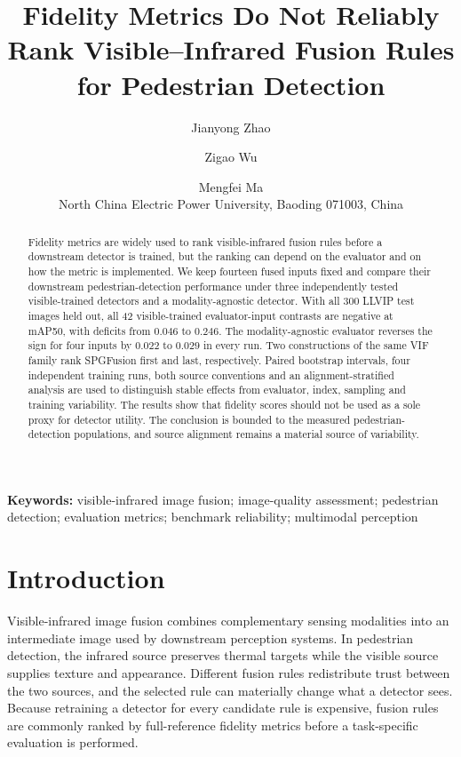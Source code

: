\documentclass[10pt,a4paper]{article}
\begin{document}
\title{Fidelity Metrics Do Not Reliably Rank Visible--Infrared Fusion Rules
for Pedestrian Detection}

\author{Jianyong Zhao \and Zigao Wu \and Mengfei Ma\\[4pt]
\small North China Electric Power University, Baoding 071003, China}
\date{}

\maketitle
\begingroup
\renewcommand{\thefootnote}{}
\endgroup

\begin{abstract}
Fidelity metrics are widely used to rank visible-infrared fusion rules before a
downstream detector is trained, but the ranking can depend on the evaluator and on how
the metric is implemented. We keep fourteen fused inputs fixed and compare their
downstream pedestrian-detection performance under three independently tested
visible-trained detectors and a modality-agnostic detector. With all 300 LLVIP test
images held out, all 42 visible-trained evaluator-input contrasts are negative at
mAP50, with deficits from $0.046$ to $0.246$. The modality-agnostic evaluator reverses
the sign for four inputs by $0.022$ to $0.029$ in every run. Two constructions of the
same VIF family rank SPGFusion first and last, respectively. Paired bootstrap
intervals, four independent training runs, both source conventions and an
alignment-stratified analysis are used to distinguish stable effects from evaluator,
index, sampling and training variability. The results show that fidelity scores should
not be used as a sole proxy for detector utility. The conclusion is bounded to the
measured pedestrian-detection populations, and source alignment remains a material
source of variability.
\end{abstract}

\noindent\textbf{Keywords:} visible-infrared image fusion; image-quality assessment;
pedestrian detection; evaluation metrics; benchmark reliability; multimodal perception

\section{Introduction}

Visible-infrared image fusion combines complementary sensing modalities into an
intermediate image used by downstream perception systems. In pedestrian detection, the
infrared source preserves thermal targets while the visible source supplies texture and
appearance. Different fusion rules redistribute trust between the two sources, and the
selected rule can materially change what a detector sees. Because retraining a detector
for every candidate rule is expensive, fusion rules are commonly ranked by
full-reference fidelity metrics before a task-specific evaluation is performed.
\end{document}
